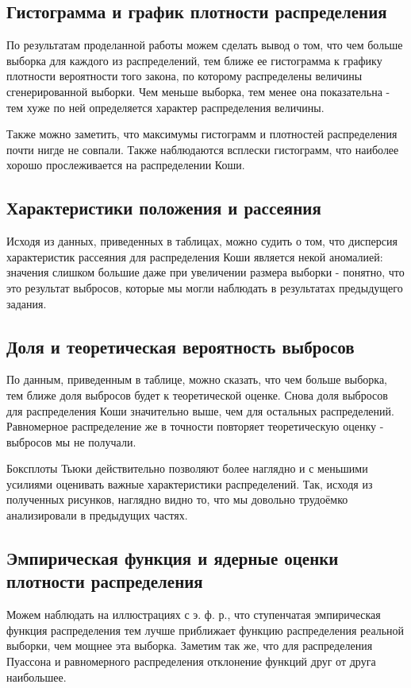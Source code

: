 \subsection{Гистограмма и график плотности распределения}
По результатам проделанной работы можем сделать вывод о том, что чем больше выборка для каждого из распределений, тем ближе ее гистограмма к графику плотности вероятности того закона, по которому распределены величины сгенерированной выборки. Чем меньше выборка, тем менее она показательна - тем хуже по ней определяется характер распределения величины.


Также можно заметить, что максимумы гистограмм и плотностей распределения почти нигде не совпали. Также наблюдаются всплески гистограмм, что наиболее хорошо прослеживается на распределении Коши.

\subsection{Характеристики положения и рассеяния}
Исходя из данных, приведенных в таблицах, можно судить о том, что дисперсия характеристик рассеяния для распределения Коши является некой аномалией: значения слишком большие даже при увеличении размера выборки - понятно, что это результат выбросов, которые мы могли наблюдать в результатах предыдущего задания.

\subsection{Доля и теоретическая вероятность выбросов}
По данным, приведенным в таблице, можно сказать, что чем больше выборка, тем ближе доля выбросов будет к теоретической оценке. Снова доля выбросов для распределения Коши значительно выше, чем для остальных распределений. Равномерное распределение же в точности повторяет теоретическую оценку - выбросов мы не получали. 


Боксплоты Тьюки действительно позволяют более наглядно и с меньшими усилиями оценивать важные характеристики распределений. Так, исходя из полученных рисунков, наглядно видно то, что мы довольно трудоёмко анализировали в предыдущих частях.

\subsection{Эмпирическая функция и ядерные оценки плотности распределения}
Можем наблюдать на иллюстрациях с э. ф. р., что ступенчатая эмпирическая функция распределения тем лучше приближает функцию распределения реальной выборки, чем мощнее эта выборка. Заметим так же, что для распределения Пуассона и равномерного распределения отклонение функций друг от друга наибольшее.


